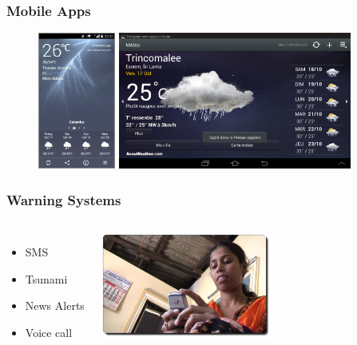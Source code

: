 \documentclass[serif,mathserif]{beamer}
\begin{document}
\begin{frame}
  \frametitle{Mobile Apps}
  \begin{figure}[t]
    \centering
    \includegraphics[height=4.5cm]{mobileApp4}
    \hspace{1mm}
    \includegraphics[height=4.5cm]{Screenshot_2014-10-17-23-57-13}
  \end{figure}
\end{frame}


\begin{frame}
  \frametitle{Warning Systems}

\begin{columns}
\begin{itemize}
\item SMS
\item Tsunami
\item News Alerts
\item Voice call
\end{itemize}

\begin{center}
    \includegraphics[height=3.5cm]{Mobile_woman_image-from-teleusebop-film}
\end{center}
\end{columns}
\end{frame}
\end{document}
